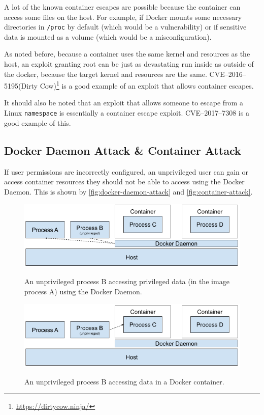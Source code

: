 \hfill

A lot of the known container escapes are possible because the container can access some files on the host. For example, if Docker mounts some necessary directories in \lstinline{/proc} by default (which would be a vulnerability) or if sensitive data is mounted as a volume (which would be a misconfiguration).

\hfill

As noted before, because a container uses the same kernel and resources as the host, an exploit granting root can be just as devastating run inside as outside of the docker, because the target kernel and resources are the same. CVE--2016--5195(Dirty Cow)\footnote{\url{https://dirtycow.ninja/}} is a good example of an exploit that allows container escapes\cite{Dirty-Cow-Escape}.

It should also be noted that an exploit that allows someone to escape from a Linux \lstinline{namespace} is essentially a container escape exploit. CVE--2017--7308\cite{CVE-2017-7308} is a good example of this.

\subsection{Docker Daemon Attack \& Container Attack}
If user permissions are incorrectly configured, an unprivileged user can gain or access container resources they should not be able to access using the Docker Daemon. This is shown by \autoref{fig:docker-daemon-attack} and \autoref{fig:container-attack}.

\begin{figure}[ht]
    \centering
    \includegraphics[width=.9\linewidth]{resources/images/attack-scenario-1.png}
    \caption{}\label{fig:docker-daemon-attack}
    \medskip
    \small
    An unprivileged process B accessing privileged data (in the image process A) using the Docker Daemon.
\end{figure}

\begin{figure}[ht]
    \centering
    \includegraphics[width=.9\linewidth]{resources/images/attack-scenario-2.png}
    \caption{}\label{fig:container-attack}
    \medskip
    \small
    An unprivileged process B accessing data in a Docker container.
\end{figure}

